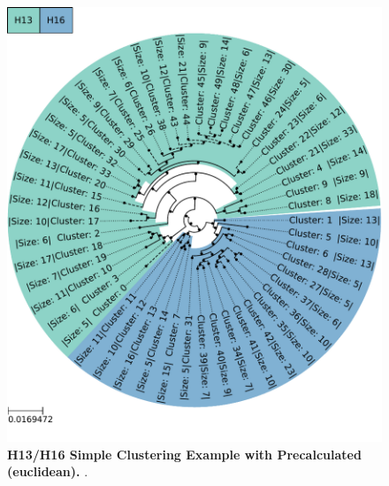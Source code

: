 \begin{figure}[!hbt]
    \centering
    \includegraphics[width=\textwidth]{PCA/Clustertree_Segment_4_H_Euclidean.pdf}
    \caption[H13/H16 Simple Clustering Example with Precalculated (euclidean)]{\textbf{H13/H16 Simple Clustering Example with Precalculated (euclidean).} .}
    \label{fig:Simple_Clustertree_Euclid}
\end{figure}